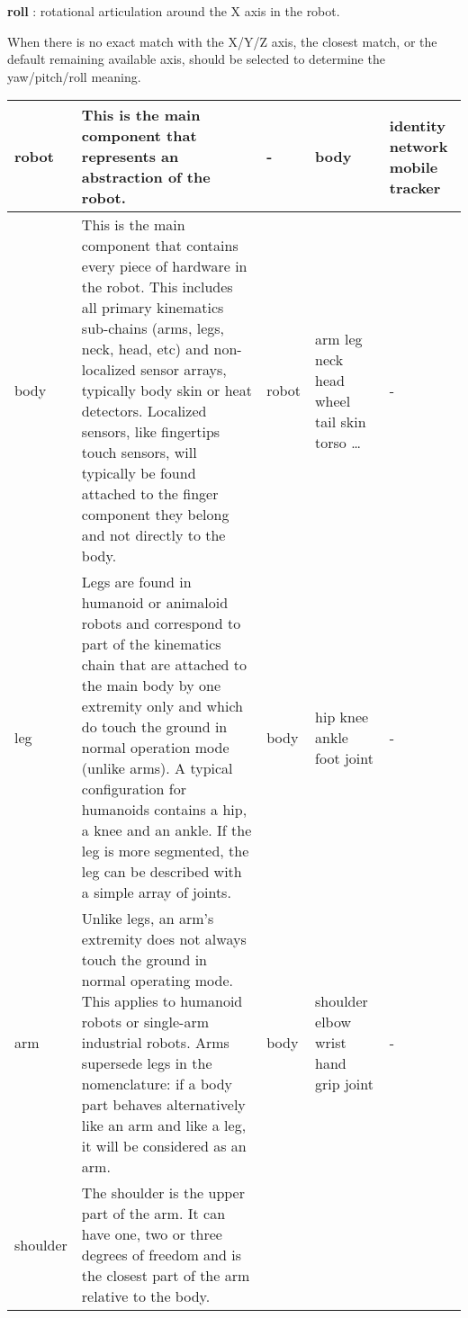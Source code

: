 \documentclass[a4paper]{article}
\begin{document}
{\sffamily
\textbf{ roll} : rotational articulation around the X axis in the
robot.}

{\sffamily
When there is no exact match with the X/Y/Z axis, the closest match, or
the default remaining available axis, should be selected to determine
the yaw/pitch/roll meaning. }

\begin{center}
\begin{supertabular}{|m{2.312cm}|m{6.776cm}|m{2.629cm}|m{2.471cm}|m{2.1269999cm}|}
robot &
\sffamily This is the main component that
represents an abstraction of the robot. &
\ttfamily {}- &
\ttfamily body &
\ttfamily identity network mobile
tracker\\\hline
body &
\sffamily This is the main component that
contains every piece of hardware in the robot. This includes all
primary kinematics sub-chains (arms, legs, neck, head, etc) and
non-localized sensor arrays, typically body skin or heat detectors.
Localized sensors, like fingertips touch sensors, will typically be
found attached to the finger component they belong and not directly to
the body.  &
\ttfamily robot &
\ttfamily arm leg neck head wheel tail skin
torso … &
\ttfamily {}-\\\hline
leg &
\sffamily Legs are found in humanoid or
animaloid robots and correspond to part of the kinematics chain that
are attached to the main body by one extremity only and which do touch
the ground in normal operation mode (unlike arms). A typical
configuration for humanoids contains a hip, a knee and an ankle. If the
leg is more segmented, the leg can be described with a simple array of
joints. &
\ttfamily body &
hip knee ankle foot joint &
\ttfamily {}-\\\hline
arm &
\sffamily Unlike legs, an arm’s extremity does
not always touch the ground in normal operating mode. This applies to
humanoid robots or single-arm industrial robots. Arms supersede legs in
the nomenclature: if a body part behaves alternatively like an arm and
like a leg, it will be considered as an arm. &
\ttfamily body &
shoulder elbow wrist hand grip  joint &
\ttfamily {}-\\\hline
shoulder &
\sffamily The shoulder is the upper part of the
arm. It can have one, two or three degrees of freedom and is the
closest part of the arm relative to the body. &

\end{supertabular}
\end{center}
\end{document}
